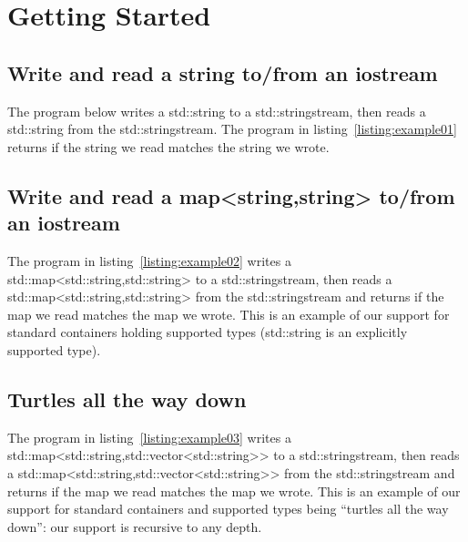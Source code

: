 \chapter{Getting Started}

\section{Write and read a {\ttfamily string} to/from an {\ttfamily iostream}}
The program below writes a {\ttfamily std::string} to a {\ttfamily
  std::stringstream}, then reads a {\ttfamily std::string} from the
{\ttfamily std::stringstream}.  The program in
listing~\ref{listing:example01} returns {} if the
string we read matches the string we wrote.

\begin{minipage}{\textwidth}

\end{minipage}

\pagebreak
\section{Write and read a {\ttfamily map<string,string>} to/from an {\ttfamily iostream}}
The program in listing~\ref{listing:example02} writes a
{\ttfamily std::map<std::string,std::string>} to a
{\ttfamily std::stringstream}, then reads a
{\ttfamily std::map<std::string,std::string>} from the
{\ttfamily std::stringstream} and returns {} if the map
we read matches the map we wrote.  This is an example of our support
for standard containers holding supported types ({\ttfamily std::string}
is an explicitly supported type).

\begin{minipage}{\textwidth}

\end{minipage}

% 

\pagebreak
\section{Turtles all the way down}
The program in listing~\ref{listing:example03} writes a
{\ttfamily std::map<std::string,std::vector<std::string>>}
to a {\ttfamily std::stringstream}, then reads a
{\ttfamily std::map<std::string,std::vector<std::string>>} from the
{\ttfamily std::stringstream} and returns {} if the map
we read matches the map we wrote.  This is an example of our support
for standard containers and supported types being ``turtles all the
way down'': our support is recursive to any depth.

